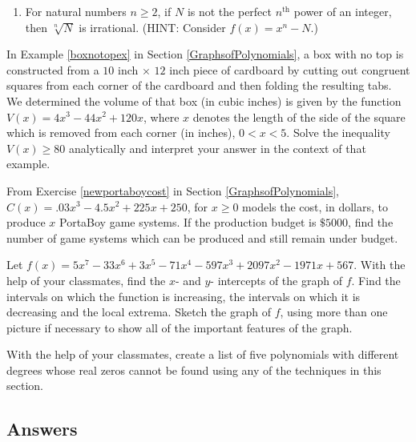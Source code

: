 \begin{exenum}
\begin{enumerate}
\item  For natural numbers $n \geq 2$, if $N$ is not the perfect $n^{\text{th}}$ power of an integer, then $\sqrt[n]{N}$ is irrational. (HINT: Consider $f(x) = x^n-N$.)

\end{enumerate}

\item  In Example \ref{boxnotopex} in Section \ref{GraphsofPolynomials}, a box with no top is constructed from a $10$ inch $\times$ $12$ inch piece of cardboard by cutting out congruent squares from each corner of the cardboard and then folding the resulting tabs.  We determined the volume of that box (in cubic inches) is given by  the function$V(x) = 4x^3-44x^2+120x$, where $x$ denotes the length of the side of the square which is removed from each corner (in inches), $0 < x < 5$.  Solve the inequality $V(x) \geq 80$ analytically and interpret your answer in the context of that example.

\item  From Exercise \ref{newportaboycost} in Section \ref{GraphsofPolynomials}, $C(x) = .03x^{3} - 4.5x^{2} + 225x + 250$, for $x \geq 0$ models the cost, in dollars, to produce $x$ PortaBoy game systems. If the production budget is $\$5000$, find the number of game systems which can be produced and still remain under budget.

\item Let $f(x) = 5x^{7} - 33x^{6} + 3x^{5} - 71x^{4} - 597x^{3} + 2097x^{2} - 1971x + 567$.  With the help of your classmates, find the $x$- and $y$- intercepts of the graph of $f$.  Find the intervals on which the function is increasing, the intervals on which it is decreasing and the local extrema.  Sketch the graph of $f$, using more than one picture if necessary to show all of the important features of the graph.  

\item With the help of your classmates, create a list of five polynomials with different degrees whose real zeros cannot be found using any of the techniques in this section.

\end{exenum}
 
\clearpage

\subsection{Answers}

\startexenum

